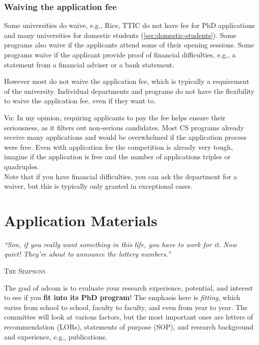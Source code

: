 \documentclass[oneside,11pt,dvipsnames]{book}
\newcommand{\myepigraphsimpsons}[1]{
\epigraph{\vspace{-0.2in} \emph{#1}}{\textsc{The Simpsons}}
}
\newenvironment{commentbox}[1][]{
  \small
  \begin{mybox}
    {\small \textbf{#1}}
  }{
  \end{mybox}
}
\begin{document}
\section{Waiving the application fee}\label{sec:fee-waive}

Some universities do waive, e.g., Rice, TTIC do not have fee for PhD applications and many universities for domestic students (\autoref{sec:domestic-students}).
Some programs also waive if the applicants attend some of their opening sessions.  Some programs waive if the applicant provide proof of financial difficulties, e.g., a statement from a financial adviser or a bank statement.

However most do not waive the application fee, which is typically a requirement of the university. Individual departments and programs do not have the flexibility to waive the application fee, even if they want to.

\begin{commentbox}{Vu:}
In my opinion, requiring applicants to pay the fee helps ensure their seriousness, as it filters out non-serious candidates. Most CS programs already receive many applications and would be overwhelmed if the application process were free.  Even with application fee the competition is already very tough, imagine if the application is free and the number of applications triples or quadruples.\\

Note that if you have financial difficulties, you can ask the department for a waiver, but this is typically only granted in exceptional cases.
\end{commentbox}



\part{Application Materials}\label{part:application}


\myepigraphsimpsons{``Son, if you really want something in this life, you have to work for it. Now quiet! They're about to announce the lottery numbers.''}


The goal of adcom is to evaluate your research experience, potential, and interest to see if you \textbf{fit into its PhD program}! The emphasis here is \emph{fitting}, which varies from school to school, faculty to faculty, and even from year to year.  
The committee will look at various factors, but the most important ones are letters of recommendation (LORs),  statements of purpose (SOP), and research background and experience, e.g., publications.
\end{document}

